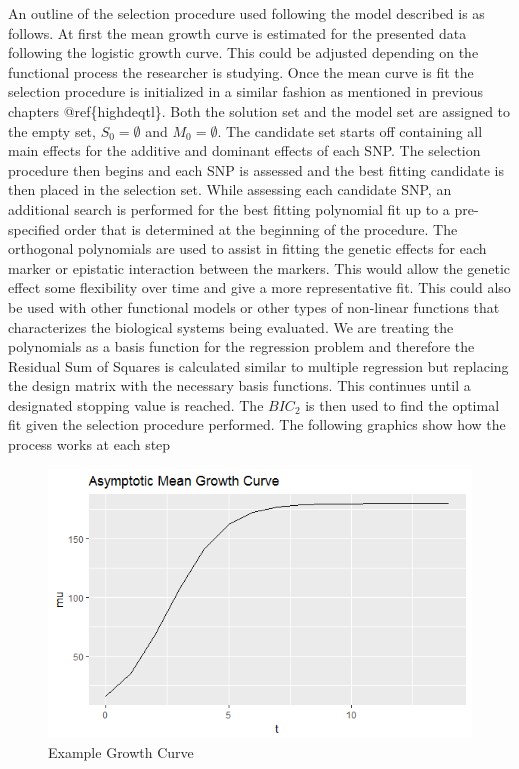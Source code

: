 \documentclass[11pt,]{book}
\theoremstyle{definition}
\theoremstyle{definition}
\theoremstyle{remark}
\begin{document}
An outline of the selection procedure used following the model described
is as follows. At first the mean growth curve is estimated for the
presented data following the logistic growth curve. This could be
adjusted depending on the functional process the researcher is studying.
Once the mean curve is fit the selection procedure is initialized in a
similar fashion as mentioned in previous chapters @ref\{highdeqtl\}.
Both the solution set and the model set are assigned to the empty set,
\(S_0=\emptyset\) and \(M_0=\emptyset\). The candidate set starts off
containing all main effects for the additive and dominant effects of
each SNP. The selection procedure then begins and each SNP is assessed
and the best fitting candidate is then placed in the selection set.
While assessing each candidate SNP, an additional search is performed
for the best fitting polynomial fit up to a pre-specified order that is
determined at the beginning of the procedure. The orthogonal polynomials
are used to assist in fitting the genetic effects for each marker or
epistatic interaction between the markers. This would allow the genetic
effect some flexibility over time and give a more representative fit.
This could also be used with other functional models or other types of
non-linear functions that characterizes the biological systems being
evaluated. We are treating the polynomials as a basis function for the
regression problem and therefore the Residual Sum of Squares is
calculated similar to multiple regression but replacing the design
matrix with the necessary basis functions. This continues until a
designated stopping value is reached. The \(BIC_2\) is then used to find
the optimal fit given the selection procedure performed. The following
graphics show how the process works at each step

\begin{figure}

{\centering \includegraphics[width=0.8\linewidth]{images/GrowthCurveExample} 

}

\caption{Example Growth Curve}\label{fig:growth-example}
\end{figure}
\end{document}
